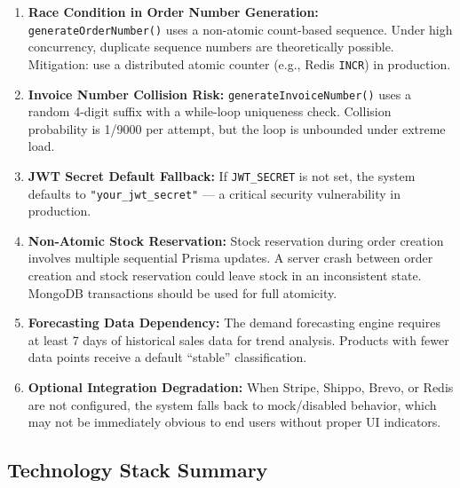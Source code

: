 \documentclass[12pt,onecolumn]{IEEEtran}
\begin{document}
\begin{tcolorbox}[warningbox,title={Known Issues and Technical Challenges}]
\begin{enumerate}[leftmargin=1.5em]
  \item \textbf{Race Condition in Order Number Generation:} \texttt{generateOrderNumber()} uses a non-atomic count-based sequence. Under high concurrency, duplicate sequence numbers are theoretically possible. Mitigation: use a distributed atomic counter (e.g., Redis \texttt{INCR}) in production.
  \item \textbf{Invoice Number Collision Risk:} \texttt{generateInvoiceNumber()} uses a random 4-digit suffix with a while-loop uniqueness check. Collision probability is 1/9000 per attempt, but the loop is unbounded under extreme load.
  \item \textbf{JWT Secret Default Fallback:} If \texttt{JWT\_SECRET} is not set, the system defaults to \texttt{"your\_jwt\_secret"} --- a critical security vulnerability in production.
  \item \textbf{Non-Atomic Stock Reservation:} Stock reservation during order creation involves multiple sequential Prisma updates. A server crash between order creation and stock reservation could leave stock in an inconsistent state. MongoDB transactions should be used for full atomicity.
  \item \textbf{Forecasting Data Dependency:} The demand forecasting engine requires at least 7 days of historical sales data for trend analysis. Products with fewer data points receive a default ``stable'' classification.
  \item \textbf{Optional Integration Degradation:} When Stripe, Shippo, Brevo, or Redis are not configured, the system falls back to mock/disabled behavior, which may not be immediately obvious to end users without proper UI indicators.
\end{enumerate}
\end{tcolorbox}

\subsection{Technology Stack Summary}
\end{document}
